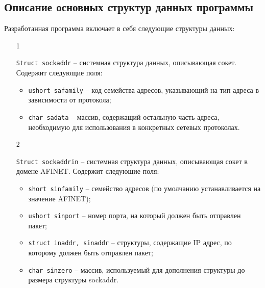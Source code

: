\subsection{Описание основных структур данных программы}

Разработанная программа включает в себя следующие структуры данных:
\begin{enumerate}
    \item[1] {{\texttt{Struct sockaddr}} -- системная структура данных, описывающая сокет\cite{linux_prog}.
    Содержит следующие поля:
        \begin{itemize}
            \item \texttt{u{\textunderscore}short sa{\textunderscore}family}\cite{unix_net} -- код семейства адресов, указывающий на тип
            адреса в зависимости от протокола;
            \item \texttt{char sa{\textunderscore}data} -- массив, содержащий остальную часть адреса,
            необходимую для использования в конкретных сетевых протоколах.
        \end{itemize}}

    \item[2] {{\texttt{Struct sockaddr{\textunderscore}in}} -- системная структура данных, описывающая сокет
    в домене AF{\textunderscore}INET\cite{opennet}. Содержит следующие поля:
        \begin{itemize}
            \item \texttt{short sin{\textunderscore}family}\cite{unix_net} -- семейство адресов (по умолчанию
            устанавливается на значение AF{\textunderscore}INET);
            \item \texttt{u{\textunderscore}short sin{\textunderscore}port}\cite{linux_prog} -- номер порта, на который должен быть
            отправлен пакет;
            \item \texttt{struct in{\textunderscore}addr, sin{\textunderscore}addr}\cite{opennet} -- структуры, содержащие IP адрес, по
            которому должен быть отправлен пакет;
            \item \texttt{char sin{\textunderscore}zero} -- массив, используемый для дополнения структуры
            до размера структуры sockaddr.
        \end{itemize}}


\end{enumerate}
